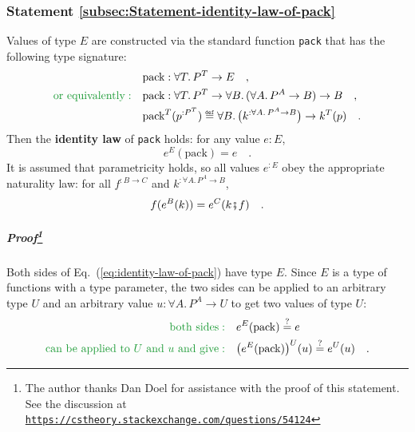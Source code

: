 \subsubsection{Statement \label{subsec:Statement-identity-law-of-pack}\ref{subsec:Statement-identity-law-of-pack}}

Values of type $E$ are constructed via the standard function \lstinline!pack!
that has the following type signature:
\begin{align*}
 & \text{pack}:\forall T.\,P^{T}\rightarrow E\quad,\\
{\color{greenunder}\text{or equivalently}:}\quad & \text{pack}:\forall T.\,P^{T}\rightarrow\forall B.\,(\forall A.\,P^{A}\rightarrow B)\rightarrow B\quad,\\
 & \text{pack}^{T}(p^{:P^{T}})\triangleq\forall B.\,\big(k^{:\forall A.\,P^{A}\rightarrow B}\big)\rightarrow k^{T}(p)\quad.
\end{align*}
Then the \textbf{identity law} of
\lstinline!pack! holds: for any value $e:E$, 
\begin{equation}
e^{E}(\text{pack})=e\quad.\label{eq:identity-law-of-pack}
\end{equation}
It is assumed that parametricity holds, so all values $e^{:E}$ obey
the appropriate naturality law: for all $f^{:B\rightarrow C}$ and
$k^{:\forall A.\,P^{A}\rightarrow B}$,
\begin{equation}
f(e^{B}(k))=e^{C}(k\bef f)\quad.\label{eq:naturality-law-of-e-derivation1}
\end{equation}


\subparagraph{Proof\protect\footnote{The author thanks Dan Doel for assistance with the
proof of this statement. See the discussion at \texttt{\protect\href{https://cstheory.stackexchange.com/questions/54124}{https://cstheory.stackexchange.com/questions/54124}}}}

Both sides of Eq.~(\ref{eq:identity-law-of-pack}) have type $E$.
Since $E$ is a type of functions with a type parameter, the two sides
can be applied to an arbitrary type $U$ and an arbitrary value $u:\forall A.\,P^{A}\rightarrow U$
to get two values of type $U$:
\begin{align*}
{\color{greenunder}\text{both sides}:}\quad & e^{E}(\text{pack})\overset{?}{=}e\\
{\color{greenunder}\text{can be applied to }U\text{ and }u\text{ and give}:}\quad & \big(e^{E}(\text{pack})\big)^{U}(u)\overset{?}{=}e^{U}(u)\quad.
\end{align*}

